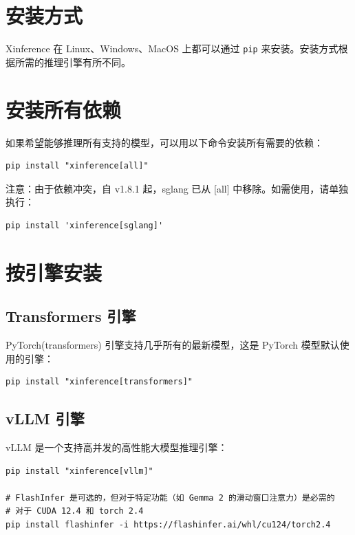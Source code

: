 \documentclass[12pt,UTF8]{ctexbook}
\begin{document}
\section{安装方式}
\label{sec:installation_methods}

Xinference 在 Linux、Windows、MacOS 上都可以通过 \texttt{pip} 来安装。安装方式根据所需的推理引擎有所不同。

\section{安装所有依赖}
\label{sec:install_all}

如果希望能够推理所有支持的模型，可以用以下命令安装所有需要的依赖：

\begin{lstlisting}
pip install "xinference[all]"
\end{lstlisting}

注意：由于依赖冲突，自 v1.8.1 起，sglang 已从 [all] 中移除。如需使用，请单独执行：

\begin{lstlisting}
pip install 'xinference[sglang]'
\end{lstlisting}

\section{按引擎安装}
\label{sec:install_by_engine}

\subsection{Transformers 引擎}

PyTorch(transformers) 引擎支持几乎所有的最新模型，这是 PyTorch 模型默认使用的引擎：

\begin{lstlisting}
pip install "xinference[transformers]"
\end{lstlisting}

\subsection{vLLM 引擎}

vLLM 是一个支持高并发的高性能大模型推理引擎：

\begin{lstlisting}
pip install "xinference[vllm]"

# FlashInfer 是可选的，但对于特定功能（如 Gemma 2 的滑动窗口注意力）是必需的
# 对于 CUDA 12.4 和 torch 2.4
pip install flashinfer -i https://flashinfer.ai/whl/cu124/torch2.4
\end{lstlisting}
\end{document}
